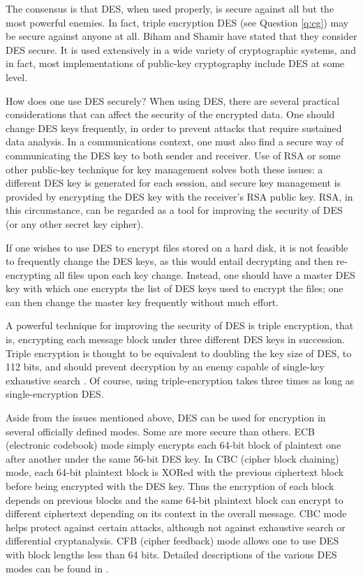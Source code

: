 The consensus is that DES, when used properly, is secure against all but
the most powerful enemies. In fact, triple encryption DES (see Question 
\ref{q:cg}) may be secure against anyone at all. Biham and Shamir have 
stated that they consider DES secure. It is used extensively in a wide 
variety of cryptographic systems, and in fact, most implementations of 
public-key cryptography include DES at some level. 

{How does one use DES securely?}
When using DES, there are several practical considerations that can
affect the security of the encrypted data. One should change DES keys 
frequently, in order to prevent attacks that require sustained data 
analysis. In a communications context, one must also find a secure way 
of communicating the DES key to both sender and receiver. Use of RSA or 
some other public-key technique for key management solves both these 
issues: a different DES key is generated for each session, and secure 
key management is provided by encrypting the DES key with the receiver's 
RSA public key. RSA, in this circumstance, can be regarded as a tool for 
improving the security of DES (or any other secret key cipher).

If one wishes to use DES to encrypt files stored on a hard disk, it is
not feasible to frequently change the DES keys, as this would entail 
decrypting and then re-encrypting all files upon each key change. Instead,
one should have a master DES key with which one encrypts the list of DES
keys used to encrypt the files; one can then change the master key 
frequently without much effort.

A powerful technique for improving the security of DES is triple encryption, 
that is, encrypting each message block under three different DES keys in 
succession. Triple encryption is thought to be equivalent to doubling the 
key size of DES, to 112 bits, and should prevent decryption by an enemy 
capable of single-key exhaustive search \cite{merkle-hellman-multiple}.
Of course, using triple-encryption takes three times as long as 
single-encryption DES.

Aside from the issues mentioned above, DES can be used for encryption in 
several officially defined modes. Some are more secure than others. ECB 
(electronic codebook) mode simply encrypts each 64-bit block of plaintext 
one after another under the same 56-bit DES key. In CBC (cipher block 
chaining) mode, each 64-bit plaintext block is XORed with the previous 
ciphertext block before being encrypted with the DES key. Thus the encryption 
of each block depends on previous blocks and the same 64-bit plaintext 
block can encrypt to different ciphertext depending on its context in the 
overall message. CBC mode helps protect against certain attacks, although 
not against exhaustive search or differential cryptanalysis. CFB (cipher 
feedback) mode allows one to use DES with block lengths less than 64 bits. 
Detailed descriptions of the various DES modes can be found in 
\cite{nist-des-modes}.

